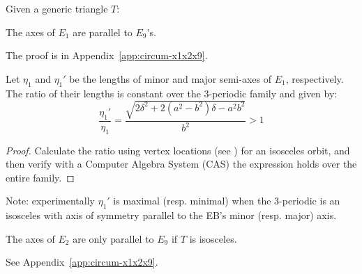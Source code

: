 Given a generic triangle $T$:

\begin{proposition}
The axes of $E_1$  are parallel to $E_9$'s. %
\end{proposition}

The proof is in Appendix~\ref{app:circum-x1x2x9}. 

\begin{theorem}
Let $\eta_1$ and $\eta_1'$ be the lengths of minor and major semi-axes of $E_1$, respectively. The ratio of their lengths is constant over the 3-periodic family and given by:
\begin{equation*}
\frac{\eta_1'}{\eta_1}=\frac{\sqrt{2\delta^2+2(a^2-b^2)\delta-a^2b^2}}{b^2} >1
\end{equation*}
\label{thm:axis-ratio}
\end{theorem}


\begin{proof}
Calculate the ratio using vertex locations (see \cite{garcia2020-new-properties}) for an isosceles orbit, and then verify with a Computer Algebra System (CAS) the expression holds over the entire family.
\end{proof}

Note: experimentally $\eta_1'$ is maximal (resp. minimal) when the 3-periodic is an isosceles with axis of symmetry parallel to the EB's minor (resp. major) axis.

\begin{proposition}
The axes of $E_2$ are only parallel to $E_9$ if $T$ is isosceles.
\end{proposition}

See Appendix~\ref{app:circum-x1x2x9}.




